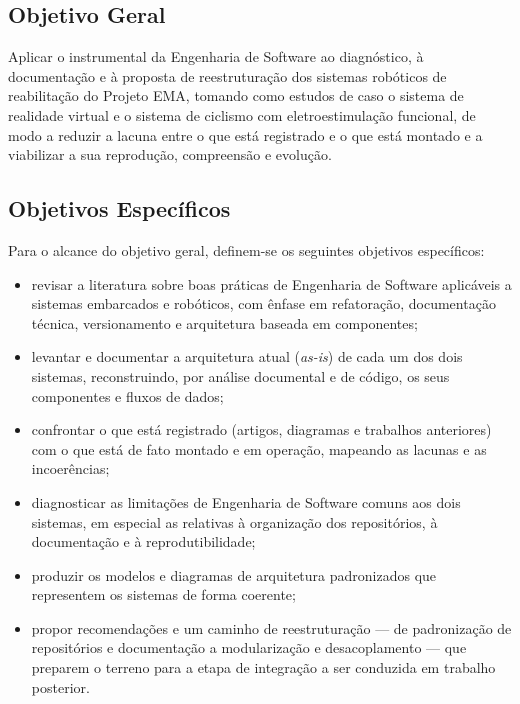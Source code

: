 \subsection{Objetivo Geral}

Aplicar o instrumental da Engenharia de Software ao diagnóstico, à documentação e à
proposta de reestruturação dos sistemas robóticos de reabilitação do Projeto EMA, tomando
como estudos de caso o sistema de realidade virtual e o sistema de ciclismo com
eletroestimulação funcional, de modo a reduzir a lacuna entre o que está registrado e o que
está montado e a viabilizar a sua reprodução, compreensão e evolução.

\subsection{Objetivos Específicos}

Para o alcance do objetivo geral, definem-se os seguintes objetivos específicos:

\begin{itemize}
	\item revisar a literatura sobre boas práticas de Engenharia de Software aplicáveis a
	      sistemas embarcados e robóticos, com ênfase em refatoração, documentação técnica,
	      versionamento e arquitetura baseada em componentes;
	\item levantar e documentar a arquitetura atual (\emph{as-is}) de cada um dos dois
	      sistemas, reconstruindo, por análise documental e de código, os seus componentes
	      e fluxos de dados;
	\item confrontar o que está registrado (artigos, diagramas e trabalhos anteriores) com
	      o que está de fato montado e em operação, mapeando as lacunas e as incoerências;
	\item diagnosticar as limitações de Engenharia de Software comuns aos dois sistemas,
	      em especial as relativas à organização dos repositórios, à documentação e à
	      reprodutibilidade;
	\item produzir os modelos e diagramas de arquitetura padronizados que representem os
	      sistemas de forma coerente;
	\item propor recomendações e um caminho de reestruturação --- de padronização de
	      repositórios e documentação a modularização e desacoplamento --- que preparem o
	      terreno para a etapa de integração a ser conduzida em trabalho posterior.
\end{itemize}

